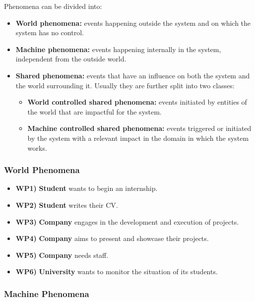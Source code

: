 Phenomena can be divided into:
\begin{itemize}
    \item \textbf{World phenomena:} events happening outside the system and on which the system has no control.
    \item \textbf{Machine phenomena:} events happening internally in the system, independent from the outside world.
    \item \textbf{Shared phenomena:} events that have an influence on both the system and the world surrounding it. Usually they are further split into two classes:
    \begin{itemize}
        \item \textbf{World controlled shared phenomena:} events initiated by entities of the world that are impactful for the system.
        \item \textbf{Machine controlled shared phenomena:} events triggered or initiated by the system with a relevant impact in the domain in which the system works.
    \end{itemize}
\end{itemize}

\subsubsection{World Phenomena}

\begin{itemize}
    \item \textbf{WP1)} \textbf{Student} wants to begin an internship.
    \item \textbf{WP2)} \textbf{Student} writes their CV.
    \item \textbf{WP3)} \textbf{Company} engages in the development and execution of projects.
    \item \textbf{WP4)} \textbf{Company} aims to present and showcase their projects.
    \item \textbf{WP5)} \textbf{Company} needs staff.
    \item \textbf{WP6)} \textbf{University} wants to monitor the situation of its students.
\end{itemize}

\subsubsection{Machine Phenomena}

